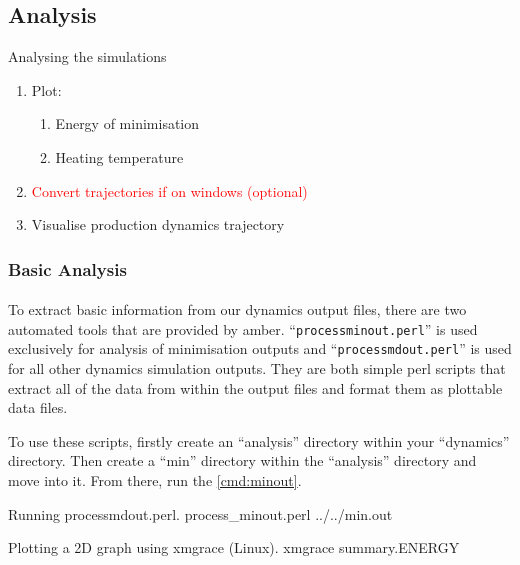 \subsection{Analysis}
    \begin{task}[label=task:Analysis]{Analysing the simulations}
        \begin{enumerate}[label=(\alph*)]
            \item Plot:
            \begin{enumerate}[label=(\roman*)]
                \item Energy of minimisation
                \item Heating temperature
            \end{enumerate}
            \item \textcolor{Red}{Convert trajectories if on windows (optional)}
            \item Visualise production dynamics trajectory
        \end{enumerate}
    \end{task}


    \subsubsection{Basic Analysis}
    \paragraph{}
        To extract basic information from our dynamics output files, there are two automated tools that are provided by amber. \enquote{\texttt{process\textunderscore minout.perl}} is used exclusively for analysis of minimisation outputs and \enquote{\texttt{process\textunderscore mdout.perl}} is used for all other dynamics simulation outputs. They are both simple perl scripts that extract all of the data from within the output files and format them as plottable data files.

        To use these scripts, firstly create an \enquote{analysis} directory within your \enquote{dynamics} directory. Then create a \enquote{min} directory within the \enquote{analysis} directory and move into it. From there, run the \cref{cmd:minout}.

    \begin{bashcmd}[label=cmd:minout]{Running process\textunderscore mdout.perl.}
    process_minout.perl ../../min.out
    \end{bashcmd}

    \begin{bashcmd}[label=cmd:xmgrace]{Plotting a 2D graph using xmgrace (Linux).}
        xmgrace summary.ENERGY
    \end{bashcmd}


